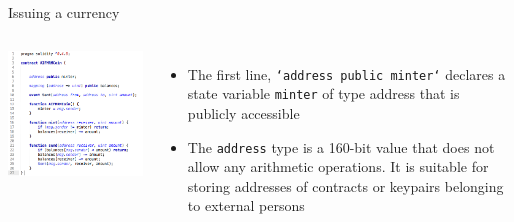 \documentclass[9pt]{beamer}
\begin{document}

\begin{frame}{Issuing a currency}
	\begin{columns}
	    \includegraphics  [scale=0.3]{Images/contract5}

	    \begin{itemize}
		    \item The first line, \texttt{`address public minter`} declares a state variable \texttt{minter} of type address that is publicly accessible
			\item The \texttt{address} type is a 160-bit value that does not allow any arithmetic operations. It is suitable for storing addresses of contracts or keypairs belonging to external persons
	    \end{itemize}
	\end{columns}
\end{frame}

\end{document}
